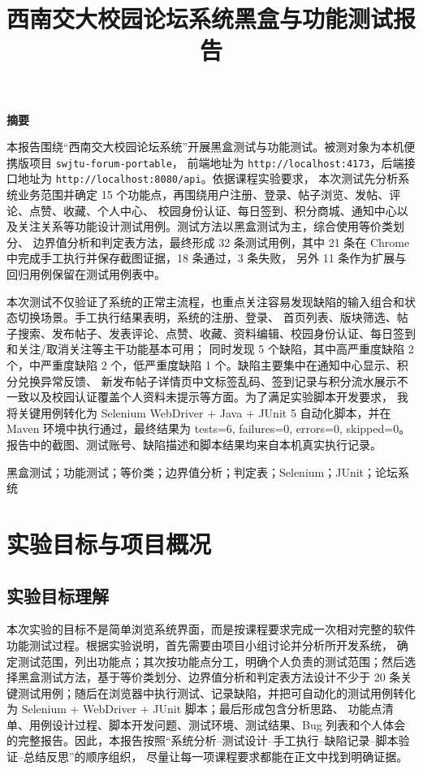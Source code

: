 \documentclass[bwprint]{report}
\title{西南交大校园论坛系统黑盒与功能测试报告}
\begin{document}
\maketitle
\newpage

\pagestyle{plain}
\begin{center}
    {\bfseries 摘要}
\end{center}

本报告围绕“西南交大校园论坛系统”开展黑盒测试与功能测试。被测对象为本机便携版项目 \texttt{swjtu-forum-portable}，
前端地址为 \texttt{http://localhost:4173}，后端接口地址为 \texttt{http://localhost:8080/api}。依据课程实验要求，
本次测试先分析系统业务范围并确定 15 个功能点，再围绕用户注册、登录、帖子浏览、发帖、评论、点赞、收藏、个人中心、
校园身份认证、每日签到、积分商城、通知中心以及关注关系等功能设计测试用例。测试方法以黑盒测试为主，综合使用等价类划分、
边界值分析和判定表方法，最终形成 32 条测试用例，其中 21 条在 Chrome 中完成手工执行并保存截图证据，18 条通过，3 条失败，
另外 11 条作为扩展与回归用例保留在测试用例表中。

本次测试不仅验证了系统的正常主流程，也重点关注容易发现缺陷的输入组合和状态切换场景。手工执行结果表明，系统的注册、登录、
首页列表、版块筛选、帖子搜索、发布帖子、发表评论、点赞、收藏、资料编辑、校园身份认证、每日签到和关注/取消关注等主干功能基本可用；
同时发现 5 个缺陷，其中高严重度缺陷 2 个，中严重度缺陷 2 个，低严重度缺陷 1 个。缺陷主要集中在通知中心显示、积分兑换异常反馈、
新发布帖子详情页中文标签乱码、签到记录与积分流水展示不一致以及校园认证覆盖个人资料未提示等方面。为了满足实验脚本开发要求，
我将关键用例转化为 Selenium WebDriver + Java + JUnit 5 自动化脚本，并在 Maven 环境中执行通过，最终结果为
tests=6, failures=0, errors=0,
skipped=0。报告中的截图、测试账号、缺陷描述和脚本结果均来自本机真实执行记录。

\vspace{0.5em}
黑盒测试；功能测试；等价类；边界值分析；判定表；Selenium；JUnit；论坛系统

\newpage
\tableofcontents
\newpage
\pagestyle{plain}
\setcounter{page}{1}

\section{实验目标与项目概况}
\subsection{实验目标理解}
本次实验的目标不是简单浏览系统界面，而是按课程要求完成一次相对完整的软件功能测试过程。根据实验说明，首先需要由项目小组讨论并分析所开发系统，
确定测试范围，列出功能点；其次按功能点分工，明确个人负责的测试范围；然后选择黑盒测试方法，基于等价类划分、边界值分析和判定表方法设计不少于
20 条关键测试用例；随后在浏览器中执行测试、记录缺陷，并把可自动化的测试用例转化为 Selenium + WebDriver + JUnit 脚本；最后形成包含分析思路、
功能点清单、用例设计过程、脚本开发问题、测试环境、测试结果、Bug 列表和个人体会的完整报告。因此，本报告按照“系统分析--测试设计--手工执行--缺陷记录--脚本验证--总结反思”的顺序组织，
尽量让每一项课程要求都能在正文中找到明确证据。
\end{document}

